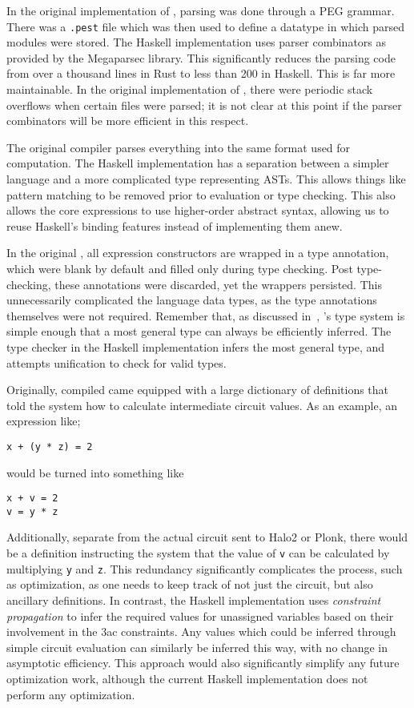 \documentclass[
    9pt,            
    techreport,       
    affiltop,       
]{art}
\begin{document}
In the original implementation of \VampIR{}, parsing was done through a PEG grammar. There was a \texttt{.pest} file which was then used to define a datatype in which parsed modules were stored. The Haskell implementation uses parser combinators as provided by the Megaparsec library. This significantly reduces the parsing code from over a thousand lines in Rust to less than 200 in Haskell. This is far more maintainable. In the original implementation of \VampIR{}, there were periodic stack overflows when certain files were parsed; it is not clear at this point if the parser combinators will be more efficient in this respect.

The original \VampIR{} compiler parses everything into the same format used for computation. The Haskell implementation has a separation between a simpler  language and a more complicated type representing \VampIR{} ASTs. This allows things like pattern matching to be removed prior to evaluation or type checking. This also allows the core expressions to use higher-order abstract syntax, allowing us to reuse Haskell's binding features instead of implementing them anew.

In the original \VampIR{}, all expression constructors are wrapped in a type annotation, which were blank by default and filled only during type checking. Post type-checking, these annotations were discarded, yet the wrappers persisted. This unnecessarily complicated the language data types, as the type annotations themselves were not required. Remember that,
as discussed in~, 
\VampIR{}'s type system is simple enough that a most general type can always be efficiently inferred. The type checker in the Haskell implementation infers the most general type, and attempts unification to check for valid types.

Originally, compiled \VampIR{} came equipped with a large dictionary of definitions that told the system how to calculate intermediate circuit values. As an example, an expression like;

\begin{verbatim}
x + (y * z) = 2
\end{verbatim}
would be turned into something like
\begin{verbatim}
x + v = 2
v = y * z
\end{verbatim}

Additionally, separate from the actual circuit sent to Halo2 or Plonk, there would be a definition instructing the system that the
value of \texttt{v} can be calculated by multiplying \texttt{y} and \texttt{z}. This redundancy significantly complicates the process, such as optimization, as one needs to keep track of not just the circuit, but also ancillary definitions. In contrast, the Haskell implementation uses \emph{constraint propagation} to infer the required values for unassigned variables based on their involvement in the \textsf{3ac} constraints. Any values which could be inferred through simple circuit evaluation can similarly be inferred this way, with no change in asymptotic efficiency. This approach would also significantly simplify any future optimization work, although the current Haskell implementation does not perform any optimization.
\end{document}
